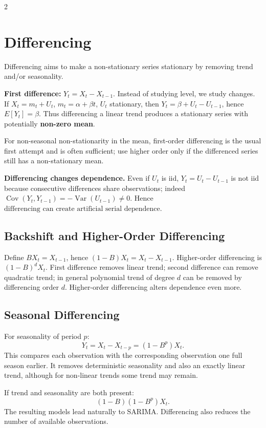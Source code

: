 \documentclass[9pt,a4paper]{extarticle}
\newcommand{\key}[1]{\textbf{#1}}
\begin{document}
\begin{multicols}{2}
\section{Differencing}

Differencing aims to make a non-stationary series stationary by removing trend and/or seasonality.

\key{First difference:} \(\boxed{Y_t=X_t-X_{t-1}}\). Instead of studying level, we study changes. If \(X_t=m_t+U_t\), \(m_t=\alpha+\beta t\), \(U_t\) stationary, then
\(Y_t=\beta+U_t-U_{t-1}\), hence \(E[Y_t]=\beta\). Thus differencing a linear trend produces a stationary series with potentially \key{non-zero mean}.

For non-seasonal non-stationarity in the mean, first-order differencing is the usual first attempt and is often sufficient; use higher order only if the differenced series still has a non-stationary mean.

\key{Differencing changes dependence.} Even if \(U_t\) is iid, \(Y_t=U_t-U_{t-1}\) is not iid because consecutive differences share observations; indeed
\(\operatorname{Cov}(Y_t,Y_{t-1})=-\operatorname{Var}(U_{t-1})\neq0\). Hence \(\boxed{\text{differencing can create artificial serial dependence}}\).

\subsection{Backshift and Higher-Order Differencing}

Define \(BX_t=X_{t-1}\), hence \((1-B)X_t=X_t-X_{t-1}\). Higher-order differencing is \((1-B)^dX_t\). First difference removes linear trend; second difference can remove quadratic trend; in general polynomial trend of degree \(d\) can be removed by differencing order \(d\). Higher-order differencing alters dependence even more.

\subsection{Seasonal Differencing}

For seasonality of period \(p\):
\[
\boxed{Y_t=X_t-X_{t-p}=(1-B^p)X_t.}
\]
This compares each observation with the corresponding observation one full season earlier. It removes deterministic seasonality and also an exactly linear trend, although for non-linear trends some trend may remain.

If trend and seasonality are both present:
\[
\boxed{(1-B)(1-B^p)X_t.}
\]
The resulting models lead naturally to SARIMA. Differencing also reduces the number of available observations.


\end{multicols}
\end{document}
